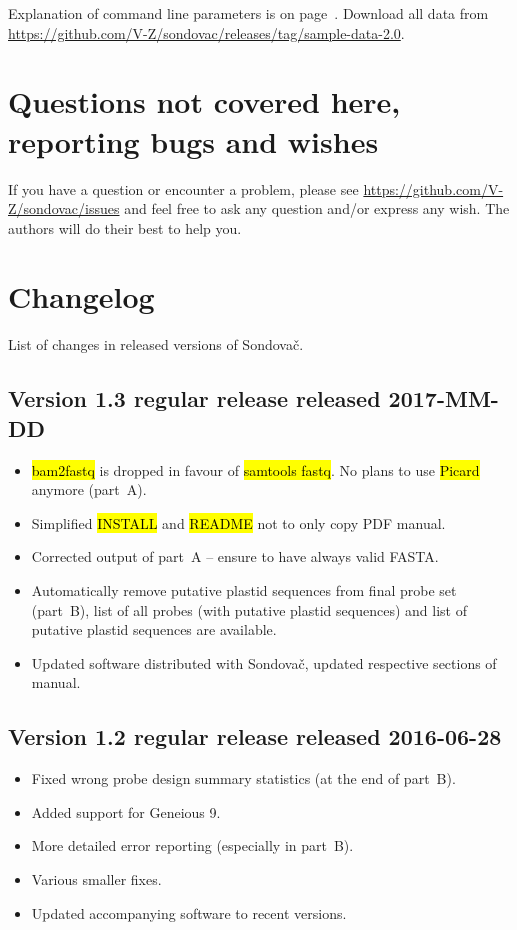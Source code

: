 \documentclass[a4paper, 11pt, twoside]{article}
\renewcommand{\texttt}[1]{\hl{\ttfamily #1}}
\begin{document}
Explanation of command line parameters is on page~\pageref{script-usage}. Download all data from \url{https://github.com/V-Z/sondovac/releases/tag/sample-data-2.0}.

\section{Questions not covered here, reporting bugs and wishes}

If you have a question or encounter a problem, please see \url{https://github.com/V-Z/sondovac/issues} and feel free to ask any question and/or express any wish. The authors will do their best to help you.

\section{Changelog} %

List of changes in released versions of Sondovač.

\subsection{Version 1.3 regular release released 2017-MM-DD}

\begin{itemize}
  \item \texttt{bam2fastq} is dropped in favour of \texttt{samtools fastq}. No plans to use \texttt{Picard} anymore (part~A).
  \item Simplified \texttt{INSTALL} and \texttt{README} not to only copy PDF manual.
  \item Corrected output of part~A -- ensure to have always valid FASTA.
  \item Automatically remove putative plastid sequences from final probe set (part~B), list of all probes (with putative plastid sequences) and list of putative plastid sequences are available.
  \item Updated software distributed with Sondovač, updated respective sections of manual.
\end{itemize}

\subsection{Version 1.2 regular release released 2016-06-28}

\begin{itemize}
  \item Fixed wrong probe design summary statistics (at the end of part~B).
  \item Added support for Geneious 9.
  \item More detailed error reporting (especially in part~B).
  \item Various smaller fixes.
  \item Updated accompanying software to recent versions.
\end{itemize}
\end{document}
